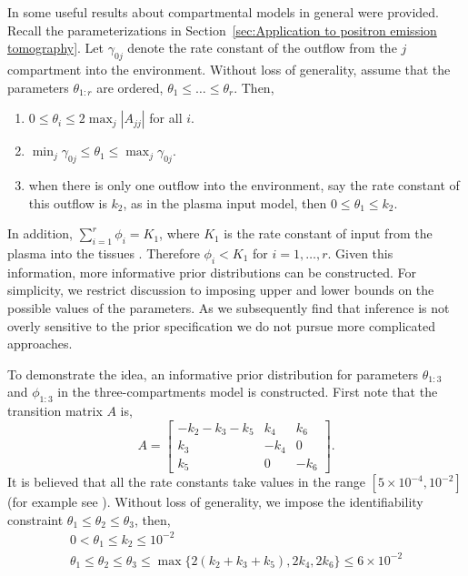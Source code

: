 In \cite{Anderson:1983wk} some useful results about compartmental models in
general were provided. Recall the parameterizations in
Section~\ref{sec:Application to positron emission tomography}. Let
$\gamma_{0j}$ denote the rate constant of the outflow from the $j$\xth
compartment into the environment. Without loss of generality, assume that the
parameters $\theta_{1:r}$ are ordered, $\theta_1 \le \dots \le \theta_r$.
Then,
\begin{enumerate}
  \item $0 \le \theta_i \le 2\max_j|A_{jj}|$ for all $i$.
  \item $\min_j\gamma_{0j} \le \theta_1 \le \max_j\gamma_{0j}$.
  \item when there is only one outflow into the environment, say the rate
    constant of this outflow is $k_2$, as in the plasma input model, then $0
    \le \theta_1 \le k_2$.
\end{enumerate}
In addition, $\sum_{i=1}^r \phi_i = K_1$, where $K_1$ is the rate constant of
input from the plasma into the tissues \cite{Gunn:2001cx}. Therefore $\phi_i
< K_1$ for $i = 1, \dots, r$. Given this information, more informative prior
distributions can be constructed. For simplicity, we restrict discussion to
imposing upper and lower bounds on the possible values of the parameters. As
we subsequently find that inference is not overly sensitive to the prior
specification we do not pursue more complicated approaches.

To demonstrate the idea, an informative prior distribution for parameters
$\theta_{1:3}$ and $\phi_{1:3}$ in the three-compartments model is
constructed. First note that the transition matrix $A$ is,
\begin{equation*}
  A = \begin{bmatrix}
    - k_2 - k_3 - k_5 & k_4  & k_6 \\
    k_3               & -k_4 & 0   \\
    k_5               & 0    & -k_6
  \end{bmatrix}.
\end{equation*}
It is believed that all the rate constants take values in the range $[5
\times 10^{-4}, 10^{-2}]$ (for example see \cite{Zhou2013,Peng:2008fx}).
Without loss of generality, we impose the identifiability constraint
$\theta_1 \leq \theta_2 \leq \theta_3$, then,
\begin{gather}
  0 < \theta_1 \le k_2 \le 10^{-2} \\
  \theta_1 \leq \theta_2 \leq \theta_3 \leq \max\{2(k_2 + k_3 + k_5), 2k_4,
  2k_6\} \le 6 \times 10^{-2}
\end{gather}

